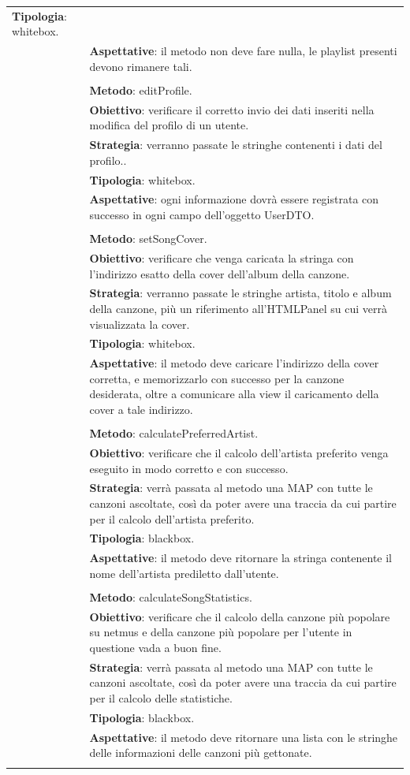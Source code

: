 \begin{footnotesize}
\begin{longtable}{|p{5.7cm}|p{10.3cm}|}
\textbf{Tipologia}: whitebox.\\&
\textbf{Aspettative}: il metodo non deve fare nulla, le playlist presenti
devono rimanere tali.\\&
\\&
\textbf{Metodo}: editProfile.\\&
\textbf{Obiettivo}: verificare il corretto invio dei dati inseriti
nella modifica del profilo di un utente.\\&
\textbf{Strategia}: verranno passate le stringhe contenenti i dati del profilo..\\&
\textbf{Tipologia}: whitebox.\\&
\textbf{Aspettative}: ogni informazione dovr\`a essere registrata con successo
in ogni campo dell'oggetto UserDTO.\\&
\\&
\textbf{Metodo}: setSongCover.\\&
\textbf{Obiettivo}: verificare che venga caricata la stringa con
l'indirizzo esatto della cover dell'album della canzone.\\&
\textbf{Strategia}: verranno passate le stringhe artista, titolo e album della
canzone, pi\`u un riferimento all'HTMLPanel su cui verr\`a visualizzata la
cover.\\&
\textbf{Tipologia}: whitebox.\\&
\textbf{Aspettative}: il metodo deve caricare l'indirizzo della cover
corretta, e memorizzarlo con successo per la canzone desiderata, oltre a
comunicare alla view il caricamento della cover a tale indirizzo.\\&
\\&
\textbf{Metodo}: calculatePreferredArtist.\\&
\textbf{Obiettivo}: verificare che il calcolo dell'artista preferito
venga eseguito in modo corretto e con successo.\\&
\textbf{Strategia}: verr\`a passata al metodo una MAP con tutte le canzoni
ascoltate, cos\`i da poter avere una traccia da cui partire per il calcolo
dell'artista preferito.\\&
\textbf{Tipologia}: blackbox.\\&
\textbf{Aspettative}: il metodo deve ritornare la stringa contenente il
nome dell'artista prediletto dall'utente.\\&
\\&
\textbf{Metodo}: calculateSongStatistics.\\&
\textbf{Obiettivo}: verificare che il calcolo della canzone pi\`u
popolare su netmus e della canzone pi\`u popolare per l'utente in questione
vada a buon fine.\\&
\textbf{Strategia}: verr\`a passata al metodo una MAP con
tutte le canzoni ascoltate, cos\`i da poter avere una traccia da cui partire per
il calcolo delle statistiche.\\&
\textbf{Tipologia}: blackbox.\\&
\textbf{Aspettative}: il metodo
deve ritornare una lista con le stringhe delle informazioni delle canzoni
pi\`u gettonate.\\&
\\


\end{longtable}
\end{footnotesize}
